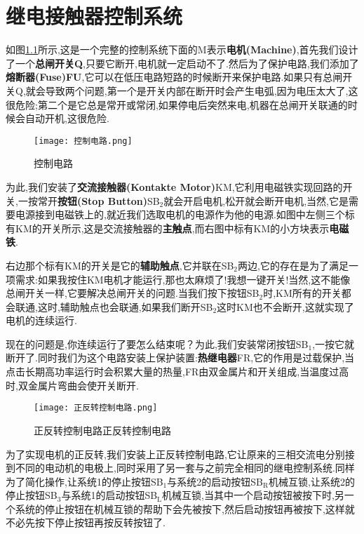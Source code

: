 \chapter{继电接触器控制系统}
\Par 如图\ref{fig:控制电路}所示,这是一个完整的控制系统下面的M表示\textbf{电机(Machine)},首先我们设计了一个\textbf{总闸开关Q},只要它断开,电机就一定启动不了.然后为了保护电路,我们添加了\textbf{熔断器(Fuse)FU},它可以在低压电路短路的时候断开来保护电路.如果只有总闸开关Q,就会导致两个问题,第一个是开关内部在断开时会产生电弧,因为电压太大了,这很危险;第二个是它总是常开或常闭,如果停电后突然来电,机器在总闸开关联通的时候会自动开机,这很危险.

\begin{figure}[htbp]
	\centering
	\texttt{[image: 控制电路.png]}
	\caption{控制电路}
	\label{fig:控制电路}
\end{figure}
\Par 为此,我们安装了\textbf{交流接触器(Kontakte Motor)}KM,它利用电磁铁实现回路的开关,一按常开\textbf{按钮(Stop Button)}SB$_2$就会开启电机,松开就会断开电机,当然,它是需要电源接到电磁铁上的,就近我们选取电机的电源作为他的电源.如图中左侧三个标有KM的开关所示,这是交流接触器的\textbf{主触点},而右图中标有KM的小方块表示\textbf{电磁铁}.

\Par 右边那个标有KM的开关是它的\textbf{辅助触点},它并联在SB$_2$两边,它的存在是为了满足一项需求:如果我按住KM电机才能运行,那也太麻烦了!我想一键开关!当然,这不能像总闸开关一样,它要解决总闸开关的问题.当我们按下按钮SB$_2$时,KM所有的开关都会联通,这时,辅助触点也会联通,如果我们断开SB$_2$这时KM也不会断开,这就实现了电机的连续运行.

\Par 现在的问题是,你连续运行了要怎么结束呢？为此,我们安装常闭按钮SB$_1$,一按它就断开了.同时我们为这个电路安装上保护装置:\textbf{热继电器}FR,它的作用是过载保护,当点击长期高功率运行时会积累大量的热量,FR由双金属片和开关组成,当温度过高时,双金属片弯曲会使开关断开.
\begin{figure}[htbp]
	\centering
	\texttt{[image: 正反转控制电路.png]}
	\caption{正反转控制电路正反转控制电路}
	\label{fig:正反转控制电路}
\end{figure}

\Par 为了实现电机的正反转,我们安装上正反转控制电路,它让原来的三相交流电分别接到不同的电动机的电极上,同时采用了另一套与之前完全相同的继电控制系统.同样为了简化操作,让系统1的停止按钮SB$_1$与系统2的启动按钮SB$_\mathrm{R}$机械互锁,让系统2的停止按钮SB$_3$与系统1的启动按钮SB$_\mathrm{L}$机械互锁,当其中一个启动按钮被按下时,另一个系统的停止按钮在机械互锁的帮助下会先被按下,然后启动按钮再被按下,这样就不必先按下停止按钮再按反转按钮了.


